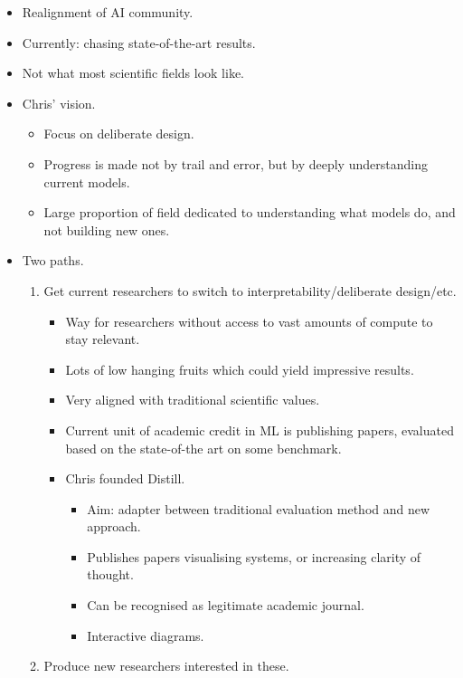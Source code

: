 \begin{itemize}
    \item Realignment of AI community.
    \item Currently: chasing state-of-the-art results.
    \item Not what most scientific fields look like.
    \item Chris' vision.
    \begin{itemize}
        \item Focus on deliberate design.
        \item Progress is made not by trail and error, but by deeply understanding current models.
        \item Large proportion of field dedicated to understanding what models do, and not building new ones.
    \end{itemize}
    \item Two paths.
    \begin{enumerate}[label=\arabic*.]
        \item Get current researchers to switch to interpretability/deliberate design/etc.
        \begin{itemize}
            \item Way for researchers without access to vast amounts of compute to stay relevant.
            \item Lots of low hanging fruits which could yield impressive results.
            \item Very aligned with traditional scientific values.
            \item Current unit of academic credit in ML is publishing papers, evaluated based on the state-of-the art on some benchmark.
            \item Chris founded Distill.
            \begin{itemize}
                \item Aim: adapter between traditional evaluation method and new approach.
                \item Publishes papers visualising systems, or increasing clarity of thought.
                \item Can be recognised as legitimate academic journal.
                \item Interactive diagrams.
            \end{itemize}
        \end{itemize}
        \item Produce new researchers interested in these.
        \begin{itemize}

\end{itemize}
\end{enumerate}
\end{itemize}

